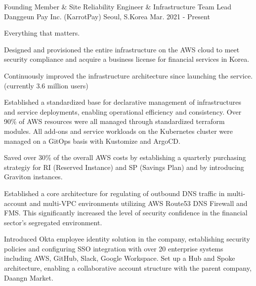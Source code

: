 

\begin{cventries}

  \cventry
    {Founding Member \& Site Reliability Engineer \& Infrastructure Team Lead} %
    {Danggeun Pay Inc. (KarrotPay)} %
    {Seoul, S.Korea} %
    {Mar. 2021 - Present} %
    {
      \begin{cvitems} %
        \item {Everything that matters.}
        \item {Designed and provisioned the entire infrastructure on the AWS cloud to meet security compliance and acquire a business license for financial services in Korea.}
        \item {Continuously improved the infrastructure architecture since launching the service. (currently 3.6 million users)}
        \item {Established a standardized base for declarative management of infrastructures and service deployments, enabling operational efficiency and consistency. Over 90\% of AWS resources were all managed through standardized terraform modules. All add-ons and service workloads on the Kubernetes cluster were managed on a GitOps basis with Kustomize and ArgoCD.}
        \item {Saved over 30\% of the overall AWS costs by establishing a quarterly purchasing strategiy for RI (Reserved Instance) and SP (Savings Plan) and by introducing Graviton instances.}
        \item {Established a core architecture for regulating of outbound DNS traffic in multi-account and multi-VPC environments utilizing AWS Route53 DNS Firewall and FMS. This significantly increased the level of security confidence in the financial sector's segregated environment.}
        \item {Introduced Okta employee identity solution in the company, establishing security policies and configuring SSO integration with over 20 enterprise systems including AWS, GitHub, Slack, Google Workspace. Set up a Hub and Spoke architecture, enabling a collaborative account structure with the parent company, Daangn Market.}
      \end{cvitems}
    }


\end{cventries}
